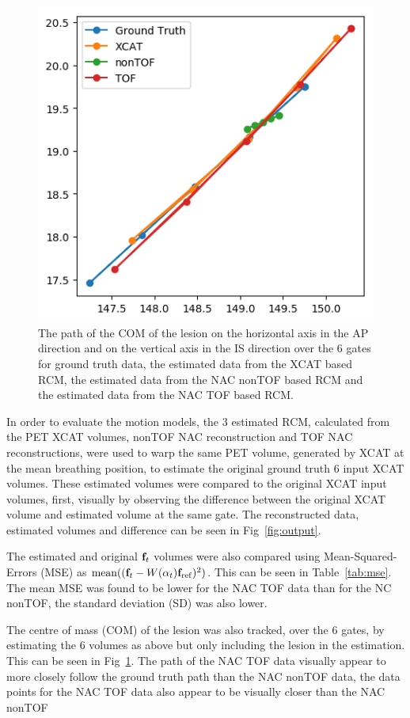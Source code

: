 \documentclass{IEEEtran}
\begin{document}
\begin{figure}
    \centering
    \includegraphics[width=0.6\linewidth]{figures/com_graph.png}
    \caption{The path of the COM of the lesion on the horizontal axis in the AP direction and on the vertical axis in the IS direction over the $6$ gates for ground truth data, the estimated data from the XCAT based RCM, the estimated data from the NAC nonTOF based RCM and the estimated data from the NAC TOF based RCM.}
    \label{fig:com_graph}
\end{figure}

In order to evaluate the motion models, the $3$ estimated RCM, calculated from the PET XCAT volumes, nonTOF NAC reconstruction and TOF NAC reconstructions, were used to warp the same PET volume, generated by XCAT at the mean breathing position, to estimate the original ground truth $6$ input XCAT volumes. These estimated volumes were compared to the original XCAT input volumes, first, visually by observing the difference between the original XCAT volume and estimated volume at the same gate. The reconstructed data, estimated volumes and difference can be seen in Fig~\ref{fig:output}.

The estimated and original $\bold{f}_t$ volumes were also compared using Mean-Squared-Errors (MSE) as $\mathrm{mean}((\bold{f}_t-W(\alpha_t) \bold{f}_\mathrm{ref})^2)$. This can be seen in Table~\ref{tab:mse}. The mean MSE was found to be lower for the NAC TOF data than for the NC nonTOF, the standard deviation (SD) was also lower.

The centre of mass (COM) of the lesion was also tracked, over the $6$ gates, by estimating the $6$ volumes as above but only including the lesion in the estimation. This can be seen in Fig~\ref{fig:com_graph}. The path of the NAC TOF data visually appear to more closely follow the ground truth path than the NAC nonTOF data, the data points for the NAC TOF data also appear to be visually closer than the NAC nonTOF
\end{document}

